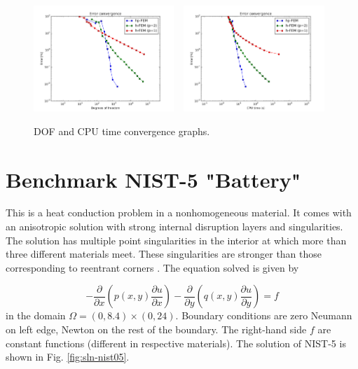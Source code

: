 \documentclass[12pt]{elsarticle}
\begin{document}
\begin{figure}[!ht]
\centering
\includegraphics[height=4cm]{nist/nist-4/conv_dof_aniso.png}\ \
\includegraphics[height=4cm]{nist/nist-4/conv_cpu_aniso.png}
\caption{DOF and CPU time convergence graphs.}
\label{fig:nist-4-conv}
\end{figure}





\section{Benchmark NIST-5 "Battery"}
\label{sec:bench-5}

This is a heat conduction problem in a nonhomogeneous material.
It comes with an anisotropic solution with strong internal disruption
layers and singularities.
The solution has multiple point singularities in the interior at which
more than three different materials meet. These singularities are stronger than those
corresponding to reentrant corners \cite{demkowicz-1}.
The equation solved is given by

\begin{equation} \label{heat-conduction}
-\frac{\partial }{\partial x}\left(p(x, y)\frac{\partial u}{\partial x}\right)
-\frac{\partial }{\partial y}\left(q(x, y)\frac{\partial u}{\partial y}\right) = f
\end{equation}
in the domain $\Omega = (0, 8.4) \times (0, 24)$. Boundary conditions are zero Neumann on left edge, Newton on the rest of the boundary.
The right-hand side $f$ are constant functions (different in respective materials).
The solution of NIST-5 is shown in Fig. \ref{fig:sln-nist05}.
\end{document}
